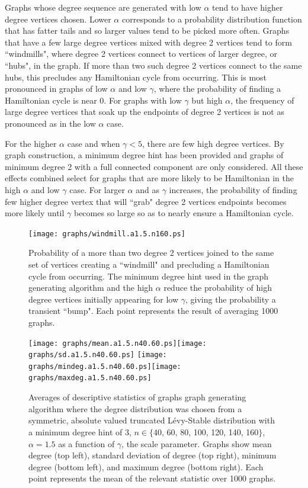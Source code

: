 \documentclass[twoside,11pt]{article}
\begin{document}
Graphs whose degree sequence are generated with low $\alpha$ tend to have higher degree vertices chosen.  Lower $\alpha$ corresponds
to a probability distribution function that has fatter tails and so larger values tend to be picked more often.
Graphs that have a few large degree vertices mixed with degree 2 vertices tend to
form ``windmills", where degree 2 vertices connect to vertices of larger degree, or ``hubs", in the graph.
If more than two such degree 2 vertices connect to the same hubs, this precludes any Hamiltonian cycle from occurring.
This is most pronounced in graphs of low $\alpha$ and low $\gamma$, where the probability of finding a Hamiltonian cycle is near 0.
For graphs with low $\gamma$ but high
$\alpha$, the frequency of large degree vertices that soak up the endpoints of degree 2 vertices
is not as pronounced as in the low $\alpha$ case.

For the higher $\alpha$ case and when $\gamma < 5$, there are few high degree vertices.  By graph construction, a minimum degree
hint has been provided and graphs of minimum degree 2 with a full connected component are only considered.  All these
effects combined select for graphs that are more likely to be Hamiltonian in the high $\alpha$ and low $\gamma$ case.
For larger $\alpha$ and as $\gamma$ increases, the probability of finding few higher degree vertex that will ``grab" degree
2 vertices endpoints becomes more likely until $\gamma$ becomes so large so as to nearly ensure a Hamiltonian cycle.

\begin{figure}
\centering
\texttt{[image: graphs/windmill.a1.5.n160.ps]}
\caption{ Probability of a more than two degree 2 vertices joined to the same set of vertices creating a
``windmill" and precluding a Hamiltonian cycle from occurring.  The minimum degree hint used
in the 
graph generating algorithm
and the high $\alpha$ reduce the probability
of high degree vertices initially appearing for low $\gamma$, giving the probability a transient
``bump".
Each point represents the result of averaging 1000 graphs.
}
\label{windmill.a1.5.n160}
\end{figure}


\begin{figure}
\centering
\texttt{[image: graphs/mean.a1.5.n40.60.ps]}\texttt{[image: graphs/sd.a1.5.n40.60.ps]}
\texttt{[image: graphs/mindeg.a1.5.n40.60.ps]}\texttt{[image: graphs/maxdeg.a1.5.n40.60.ps]}
\caption{Averages of descriptive statistics of graphs 
graph generating algorithm
where
the degree distribution was chosen from a symmetric, absolute valued truncated L\'evy-Stable distribution
with a minimum degree hint of 3, $n \in \{$40, 60, 80, 100, 120, 140, 160$\}$, $\alpha=1.5$ as a function of $\gamma$,
the scale parameter.
Graphs show mean degree (top left), standard deviation of degree (top right), minimum degree (bottom left), and maximum degree (bottom right). 
Each point represents the mean of the relevant statistic over 1000 graphs.
}
\label{mindeg.a1.5}
\label{meandeg.a1.5}
\label{maxdeg.a1.5}
\label{sd.a1.5}
\end{figure}
\end{document}
